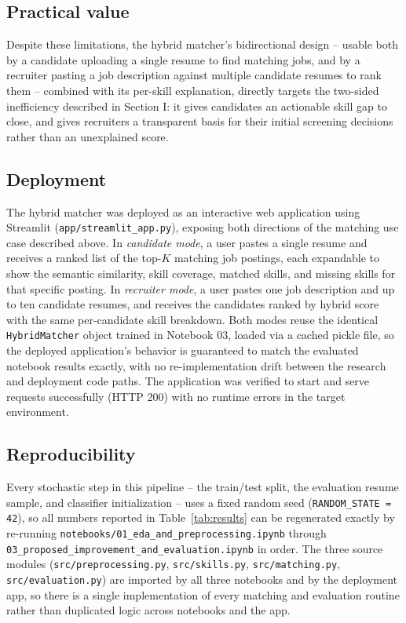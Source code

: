\documentclass[conference]{IEEEtran}
\begin{document}
\subsection{Practical value}

Despite these limitations, the hybrid matcher's bidirectional design -- usable both by a candidate uploading a single resume to find matching jobs, and by a recruiter pasting a job description against multiple candidate resumes to rank them -- combined with its per-skill explanation, directly targets the two-sided inefficiency described in Section I: it gives candidates an actionable skill gap to close, and gives recruiters a transparent basis for their initial screening decisions rather than an unexplained score.

\subsection{Deployment}

The hybrid matcher was deployed as an interactive web application using Streamlit (\texttt{app/streamlit\_app.py}), exposing both directions of the matching use case described above. In \emph{candidate mode}, a user pastes a single resume and receives a ranked list of the top-$K$ matching job postings, each expandable to show the semantic similarity, skill coverage, matched skills, and missing skills for that specific posting. In \emph{recruiter mode}, a user pastes one job description and up to ten candidate resumes, and receives the candidates ranked by hybrid score with the same per-candidate skill breakdown. Both modes reuse the identical \texttt{HybridMatcher} object trained in Notebook 03, loaded via a cached pickle file, so the deployed application's behavior is guaranteed to match the evaluated notebook results exactly, with no re-implementation drift between the research and deployment code paths. The application was verified to start and serve requests successfully (HTTP 200) with no runtime errors in the target environment.

\subsection{Reproducibility}

Every stochastic step in this pipeline -- the train/test split, the evaluation resume sample, and classifier initialization -- uses a fixed random seed (\texttt{RANDOM\_STATE = 42}), so all numbers reported in Table~\ref{tab:results} can be regenerated exactly by re-running \texttt{notebooks/01\_eda\_and\_preprocessing.ipynb} through \texttt{03\_proposed\_improvement\_and\_evaluation.ipynb} in order. The three source modules (\texttt{src/preprocessing.py}, \texttt{src/skills.py}, \texttt{src/matching.py}, \texttt{src/evaluation.py}) are imported by all three notebooks and by the deployment app, so there is a single implementation of every matching and evaluation routine rather than duplicated logic across notebooks and the app.
\end{document}

